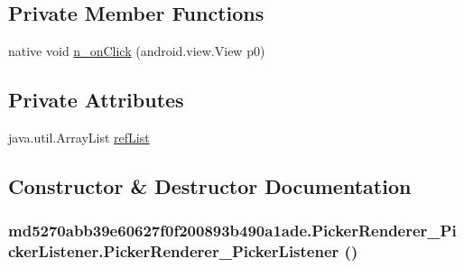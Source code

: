 \subsection*{Private Member Functions}
\begin{CompactItemize}
\item 
native void \hyperlink{classmd5270abb39e60627f0f200893b490a1ade_1_1_picker_renderer___picker_listener_f7485a983e27982e45d9a0b9eacd6ab5}{n\_\-onClick} (android.view.View p0)
\end{CompactItemize}
\subsection*{Private Attributes}
\begin{CompactItemize}
\item 
java.util.ArrayList \hyperlink{classmd5270abb39e60627f0f200893b490a1ade_1_1_picker_renderer___picker_listener_b8b564f9c49032cb1d7d689a8ca19e1a}{refList}
\end{CompactItemize}


\subsection{Constructor \& Destructor Documentation}
\hypertarget{classmd5270abb39e60627f0f200893b490a1ade_1_1_picker_renderer___picker_listener_ef8c4524350f9ce4bd6e7b6e89fad1b3}{
\subsubsection[{PickerRenderer\_\-PickerListener}]{\setlength{\rightskip}{0pt plus 5cm}md5270abb39e60627f0f200893b490a1ade.PickerRenderer\_\-PickerListener.PickerRenderer\_\-PickerListener ()}}
\label{classmd5270abb39e60627f0f200893b490a1ade_1_1_picker_renderer___picker_listener_ef8c4524350f9ce4bd6e7b6e89fad1b3}




